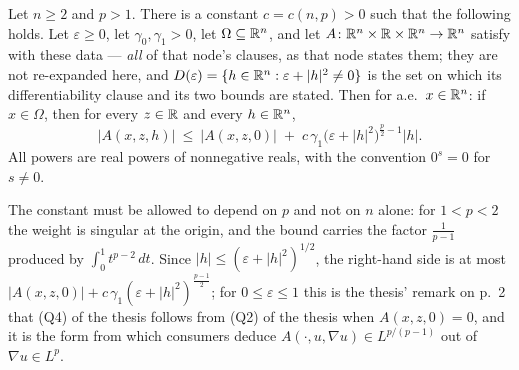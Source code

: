 \begin{helper}
Let $n\ge2$ and $p>1$.  There is a constant $c=c(n,p)>0$ such that the
following holds.  Let $\varepsilon\ge0$, let $\gamma_0,\gamma_1>0$, let
$\Omega\subseteq\mathbb{R}^n$, and let $A\colon\mathbb{R}^n\times\mathbb{R}\times\mathbb{R}^n\to\mathbb{R}^n$ satisfy
 with these data --- \emph{all} of that node's
clauses, as that node states them; they are not re-expanded here, and
$D(\varepsilon)=\{h\in\mathbb{R}^n:\varepsilon+|h|^2\ne0\}$ is the set on which its
differentiability clause and its two bounds are stated.
Then for a.e.\ $x\in\mathbb{R}^n$: if $x\in\Omega$, then for every $z\in\mathbb{R}$ and every
$h\in\mathbb{R}^n$,
\[
|A(x,z,h)|\ \le\ |A(x,z,0)|
\;+\;c\,\gamma_1\bigl(\varepsilon+|h|^2\bigr)^{\frac p2-1}|h| .
\]
All powers are real powers of nonnegative reals, with the convention
$0^{s}=0$ for $s\ne0$.

The constant must be allowed to depend on $p$ and not on $n$ alone: for
$1<p<2$ the weight is singular at the origin, and the bound carries the factor
$\frac1{p-1}$ produced by $\int_0^1t^{p-2}\,dt$.  Since
$|h|\le(\varepsilon+|h|^2)^{1/2}$, the right-hand side is at most
$|A(x,z,0)|+c\,\gamma_1(\varepsilon+|h|^2)^{\frac{p-1}2}$; for
$0\le\varepsilon\le1$ this is the thesis' remark on p.~2 that (Q4) of the thesis
follows from (Q2) of the thesis when $A(x,z,0)=0$, and it is the form from which
consumers deduce $A(\cdot,u,\nabla u)\in L^{p/(p-1)}$ out of $\nabla u\in L^p$.
\end{helper}

